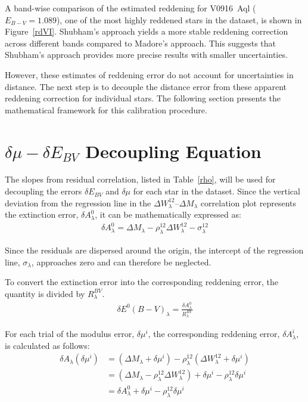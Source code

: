 A band-wise comparison of the estimated reddening for V0916~Aql ($E_{B-V} = 1.089$), one of the most highly reddened stars in the dataset, is shown in Figure~\ref{rdVI}. Shubham's approach yields a more stable reddening correction across different bands compared to Madore's approach. This suggests that Shubham's approach provides more precise results with smaller uncertainties.

However, these estimates of reddening error do not account for uncertainties in distance. The next step is to decouple the distance error from these apparent reddening correction for individual stars. The following section presents the mathematical framework for this calibration procedure.



\section{$\delta \mu - \delta E_{BV}$ Decoupling Equation }

The slopes from residual correlation, listed in Table~\ref{rho}, will be used for decoupling the errors $\delta E_{BV}$ and $\delta \mu$ for each star in the dataset. Since the vertical deviation from the regression line in the $\Delta W_\lambda^{12}$--$\Delta M_\lambda$ correlation plot represents the extinction error, $\delta A^0_\lambda$,  it can be mathematically expressed as:
\begin{align}
	\label{eq:extictionerror}
	\delta A^0_\lambda = \Delta M_\lambda - \rho_\lambda^{12} \Delta W_\lambda^{12}  - \sigma_\lambda^{12}
\end{align}

Since the residuals are dispersed around the origin, the intercept of the regression line, $\sigma_\lambda$, approaches zero and can therefore be neglected.

To convert the extinction error into the corresponding reddening error, the quantity is divided by $R^{BV}_\lambda$.
\begin{align}
	\label{eq:reddeningerror}
	\delta E^0(B-V)_{\lambda} = \frac{\delta A^0_\lambda}{R_\lambda^{BV}} 
\end{align}

For each trial of the modulus error, $\delta \mu^i$, the corresponding reddening error, $\delta A_\lambda^i$, is calculated as follows:
\begin{align*}
    \delta A_\lambda (\delta \mu^i) 
        &= (\Delta M_\lambda + \delta \mu^i)
        - \rho_\lambda^{12} (\Delta W_\lambda^{12} + \delta \mu^i)\\
        &= (\Delta M_\lambda - \rho_\lambda^{12} \Delta W_\lambda^{12})
        + \delta \mu^i - \rho_\lambda^{12} \delta \mu^i \\
        &= \delta A^0_\lambda + \delta \mu^i - \rho_\lambda^{12} \delta \mu^i 
\end{align*}

